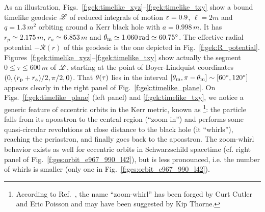 As an illustration, Figs.~\ref{f:gek:timelike_xyz}--\ref{f:gek:timelike_txy}
show a bound timelike geodesic $\mathscr{L}$ of reduced integrals of motion
$\varepsilon=0.9$, $\ell=2 m$ and $q=1.3\, m^2$
orbiting around a Kerr black hole with $a=0.998\, m$.
It has $r_p \simeq 2.175\, m$,
$r_a \simeq 6.853\, m$ and $\theta_{\rm m} \simeq 1.060\, {\rm rad} \simeq 60.75^\circ$.
The effective radial potential
$-\mathcal{R}(r)$ of this geodesic is the one depicted in Fig.~\ref{f:gek:R_potential}.
Figures~\ref{f:gek:timelike_xyz}--\ref{f:gek:timelike_txy} show actually the
segment $0\leq \tau \leq 600 \, m$ of $\mathscr{L}$,
starting at the point of Boyer-Lindquist coordinates
$(0, (r_{\rm p} + r_{\rm a})/2, \pi/2, 0)$.
That $\theta(\tau)$ lies in the interval
$[\theta_{\rm m}, \pi-\theta_{\rm m}] \sim [60^\circ, 120^\circ]$ appears clearly in the
right panel of Fig.~\ref{f:gek:timelike_plane}. On Figs.~\ref{f:gek:timelike_plane}
(left panel) and \ref{f:gek:timelike_txy}, we notice a generic feature
of eccentric orbits in the Kerr metric, known as
\footnote{According to Ref.~\cite{GlampK02},
the name ``zoom-whirl'' has been forged by Curt Cutler and Eric Poisson and
may have been suggested by Kip Thorne.}:
the particle falls
from its apoastron to the central region (``zoom in'') and performs some
quasi-circular revolutions at close distance to the black hole (it ``whirls''), reaching
the periastron, and finally goes back to the apoastron. The zoom-whirl behavior
exists as well for eccentric orbits in Schwarzschild spacetime (cf. right panel
of Fig.~\ref{f:ges:orbit_e967_990_l42}), but is less
pronounced, i.e. the number of whirls is smaller (only one in
Fig.~\ref{f:ges:orbit_e967_990_l42}).


